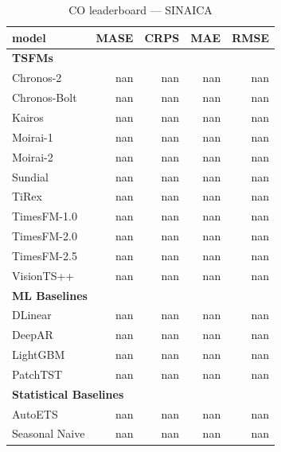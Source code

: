 \begin{table}[H]
\caption{CO leaderboard --- SINAICA}
\centering
\begin{small}
\begin{tabular}{lrrrr}
\toprule
model & MASE & CRPS & MAE & RMSE \\
\midrule
\multicolumn{5}{l}{\textbf{TSFMs}} \\
Chronos-2 & nan & nan & nan & nan \\
Chronos-Bolt & nan & nan & nan & nan \\
Kairos & nan & nan & nan & nan \\
Moirai-1 & nan & nan & nan & nan \\
Moirai-2 & nan & nan & nan & nan \\
Sundial & nan & nan & nan & nan \\
TiRex & nan & nan & nan & nan \\
TimesFM-1.0 & nan & nan & nan & nan \\
TimesFM-2.0 & nan & nan & nan & nan \\
TimesFM-2.5 & nan & nan & nan & nan \\
VisionTS++ & nan & nan & nan & nan \\
\midrule
\multicolumn{5}{l}{\textbf{ML Baselines}} \\
DLinear & nan & nan & nan & nan \\
DeepAR & nan & nan & nan & nan \\
LightGBM & nan & nan & nan & nan \\
PatchTST & nan & nan & nan & nan \\
\midrule
\multicolumn{5}{l}{\textbf{Statistical Baselines}} \\
AutoETS & nan & nan & nan & nan \\
Seasonal Naive & nan & nan & nan & nan \\
\bottomrule
\end{tabular}
\end{small}
\end{table}